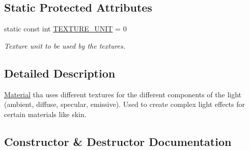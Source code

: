 \subsection*{Static Protected Attributes}
\begin{DoxyCompactItemize}
\item 
\mbox{\label{class_geometry_engine_1_1_geometry_material_1_1_multi_texture_material_a200a3e365c31d93a6566d52b7e84c0f9}} 
static const int \mbox{\hyperlink{class_geometry_engine_1_1_geometry_material_1_1_multi_texture_material_a200a3e365c31d93a6566d52b7e84c0f9}{T\+E\+X\+T\+U\+R\+E\+\_\+\+U\+N\+IT}} = 0
\begin{DoxyCompactList}\small\item\em Texture unit to be used by the textures. \end{DoxyCompactList}\end{DoxyCompactItemize}


\subsection{Detailed Description}
\mbox{\hyperlink{class_geometry_engine_1_1_geometry_material_1_1_material}{Material}} tha uses different textures for the different components of the light (ambient, diffuse, specular, emissive). Used to create complex light effects for certain materials like skin. 

\subsection{Constructor \& Destructor Documentation}
\mbox{\label{class_geometry_engine_1_1_geometry_material_1_1_multi_texture_material_a2d6f8773c523bc6ddab05b9d76db9020}} 
